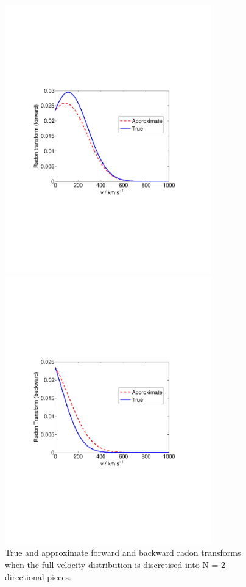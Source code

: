 \begin{figure}[t]
\label{fig:directional:radonN2}
  \centering
  \includegraphics[trim={2cm 8cm 2cm 8cm},clip,width=0.80\textwidth]{Directional/N2-forward.pdf}

  \includegraphics[trim={2cm 8cm 2cm 8cm},clip,width=0.80\textwidth]{Directional/N2-backward.pdf}

\caption[Discretised Radon transform for $N=2$ components]{True and approximate forward and backward radon transforms when the full velocity distribution is discretised into N = 2 directional pieces. }
\end{figure}



